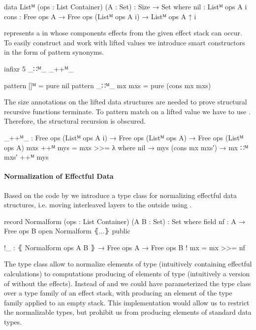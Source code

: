 \begin{code}
data Listᴹ (ops : List Container) (A : Set) : {Size} → Set where
  nil   : Listᴹ ops A {i}
  cons  : Free ops A → Free ops (Listᴹ ops A {i}) → Listᴹ ops A {↑ i}
\end{code}
\AgdaSpace{}\AgdaSpace{}
represents a \AgdaSpace{} in whose components
effects from the given effect stack  can occur.
To easily construct and work with lifted values we introduce smart constructors
in the form of pattern synonyms.

\begin{code}[hide]
infixr 5 _∷ᴹ_ _++ᴹ_
\end{code}
\begin{code}
pattern []ᴹ          = pure nil
pattern _∷ᴹ_ mx mxs  = pure (cons mx mxs)
\end{code}
The size annotations on the lifted data structures are needed to prove
structural recursive functions terminate.
To pattern match on a lifted value we have to use \AgdaFunction{>>=}.
Therefore, the structural recursion is obscured.

\begin{code}
_++ᴹ_ : Free ops (Listᴹ ops A {i}) → Free ops (Listᴹ ops A) → Free ops (Listᴹ ops A)
mxs ++ᴹ mys = mxs >>= λ where
  nil             → mys
  (cons mx mxs′)  → mx ∷ᴹ mxs′ ++ᴹ mys
\end{code}

\paragraph{Normalization of Effectful Data}

Based on the code by \textcite{bunkenburg2019modeling} we introduce a type
class for normalizing effectful data structures, i.e. moving interleaved
 layers to the outside using \AgdaFunction{>>=}.

\begin{code}
record Normalform (ops : List Container) (A B : Set) : Set where
  field nf : A → Free ops B
open Normalform ⦃...⦄ public

!_ : ⦃ Normalform ops A B ⦄ → Free ops A → Free ops B
! mx = mx >>= nf
\end{code}
The type class allow to normalize elements of type  (intuitively
containing effectful calculations) to computations producing of elements of type
 (intuitively a version of  without the effects).
Instead of  and  we could have parameterized the
type class over a type family of an effect stack, with 
producing an element of the type family applied to an empty stack.
This implementation would allow us to restrict the normalizable types, but
prohibit us from producing elements of standard data types.

